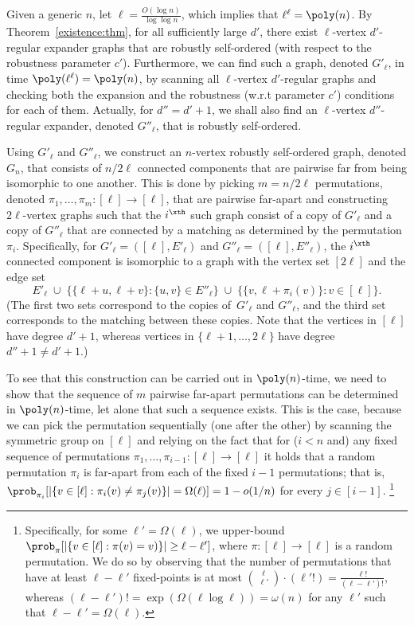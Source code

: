Given a generic $n$, let $\ell=\frac{O(\log n)}{\log\log n}$,
which implies that $\ell^\ell=\poly(n)$.
By Theorem~\ref{existence:thm}, for all sufficiently large $d'$,
there exist $\ell$-vertex $d'$-regular expander graphs
that are robustly self-ordered
(with respect to the robustness parameter $c'$).
Furthermore, we can find such a graph, denoted $G'_\ell$,
in time $\poly(\ell^\ell)=\poly(n)$,
by scanning all $\ell$-vertex $d'$-regular graphs and checking
both the expansion and the robustness (w.r.t parameter $c'$)
conditions for each of them.
%
%
%
Actually, for $d''=d'+1$, we shall also find
an $\ell$-vertex $d''$-regular expander, denoted $G''_\ell$,
that is robustly self-ordered.

Using $G'_\ell$ and $G''_\ell$, we construct an $n$-vertex
robustly self-ordered graph, denoted $G_n$,
that consists of $n/2\ell$ connected components that
are pairwise far from being isomorphic to one another.
This is done by picking $m=n/2\ell$ permutations,
denoted $\pi_1,\ldots,\pi_m:[\ell]\to[\ell]$,
that are pairwise far-apart
and constructing $2\ell$-vertex graphs
such that the $i^\xth$ such graph consist of
a copy of $G'_\ell$ and a copy of $G''_\ell$ that are connected
by a matching as determined by the permutation $\pi_i$.
Specifically,
for $G'_\ell=([\ell],E'_\ell)$ and $G''_\ell=([\ell],E''_\ell)$,
the $i^\xth$ connected component is isomorphic
to a graph with the vertex set $[2\ell]$
and the edge set
\begin{equation}\label{edges-of-cc:eq1}
E'_\ell \;\cup\; \{\{\ell+u,\ell+v\}:\{u,v\}\in E''_\ell\}
         \;\cup\; \{\{v,\ell+\pi_i(v)\}:v\!\in\![\ell]\}.
\end{equation}
(The first two sets correspond to the copies of~$G'_\ell$ and $G''_\ell$,
and the third set corresponds to the matching between these copies.
Note that the vertices in $[\ell]$ have degree $d'+1$,
whereas vertices in $\{\ell+1,\ldots,2\ell\}$ have degree $d''+1\neq d'+1$.)


To see that this construction can be carried out in $\poly(n)$-time,
we need to show that the sequence of $m$ pairwise far-apart permutations
can be determined in $\poly(n)$-time, let alone that such a sequence exists.
This is the case, because we can pick the permutation sequentially
(one after the other) by scanning the symmetric group on $[\ell]$
and relying on the fact that for ($i<n$ and) any fixed sequence
of permutations $\pi_1,\ldots,\pi_{i-1}:[\ell]\to[\ell]$
it holds that a random permutation $\pi_i$ is far-apart from
each of the fixed $i-1$ permutations; that is,
$\prob_{\pi_i}[|\{v\in[\ell]:\pi_i(v)\neq\pi_j(v)\}|=\Omega(\ell)]=1-o(1/n)$
for every $j\in[i-1]$.
\footnote{Specifically, for some $\ell'=\Omega(\ell)$,
we upper-bound $\prob_{\pi}[|\{v\in[\ell]:\pi(v)=v)\}|\geq\ell-\ell']$,
where $\pi:[\ell]\to[\ell]$ is a random permutation.
We do so by observing that the number of permutations
that have at least $\ell-\ell'$ fixed-points is at most
$\binom{\ell}{\ell'}\cdot(\ell'!)=\frac{\ell!}{(\ell-\ell')!}$,
whereas $(\ell-\ell')!=\exp(\Omega(\ell\log\ell))=\omega(n)$
for any $\ell'$ such that $\ell-\ell'=\Omega(\ell)$.}
%
%

